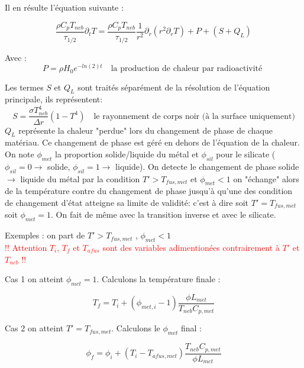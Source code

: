 \documentclass[10pt,a4paper]{article}
\numberwithin{equation}{section}
\begin{document}
Il en résulte l'équation suivante :


\begin{equation}
\frac{\rho C_p T_{neb}}{\tau_{1/2}} \partial_{t} T = \frac{\rho C_p T_{neb}}{\tau_{1/2}} \frac{1}{r^2} \partial_{r} ( {r}^2 \partial_{r} T)  + P +( S + Q_L)
\end{equation}


Avec :
\begin{equation}
 P = \rho H_0 e^{-ln(2) t} \quad \textrm{la production de chaleur par radioactivité }
\end{equation}

Les termes $S$ et $Q_L$ sont traités séparément de la résolution de l'équation principale, ils représentent: 
\begin{equation}
 S =\frac{\sigma T_{neb}^4}{\Delta r}( 1 - T^4)  \quad \textrm{le rayonnement de corps noir (à la surface uniquement)}
\end{equation}
$Q_L$ représente la chaleur "perdue" lors du changement de phase de chaque matériau. Ce changement de phase est géré en dehors de l'équation de la chaleur. On note $\phi_{met}$ la proportion solide/liquide du métal et $\phi_{sil}$ pour le silicate ($\phi_{sil} = 0 \rightarrow$ solide, $\phi_{sil} = 1 \rightarrow$ liquide). On detecte le changement de phase solide $\rightarrow$ liquide du métal par la condition  $T' > T_{fus,met} $ et $ \phi_{met} < 1$ on "échange" alors de la température contre du changement de phase jusqu'à qu'une des condition de changement d'état atteigne sa limite de validité: c'est à dire soit $T' = T_{fus,met}$ soit $\phi_{met} = 1$. On fait de même avec la transition inverse et avec le silicate.

Exemples : on part de $T' > T_{fus,met}$ , $ \phi_{met} < 1$  \\
\textcolor{red}{!! Attention $T_i$, $T_f$ et $T_{afus}$ sont des variables adimentionées contrairement à $T'$ et $T_{neb}$ !!}


Cas 1 on atteint $\phi_{met} = 1$. Calculons la température finale : 

\begin{equation}
T_{f} =  T_{i} +  (\phi_{met,i} - 1 ) \frac{\phi L_{met}}{T_{neb} C_{p,met} }
\end{equation}

Cas 2 on atteint $T' = T_{fus,met}$. Calculons le $\phi_{met}$ final : 

\begin{equation}
\phi_{f} =  \phi_{i} +  (T_{i}-T_{afus,met}) \frac{T_{neb} C_{p,met}}{\phi L_{met}}
\end{equation}
\end{document}
